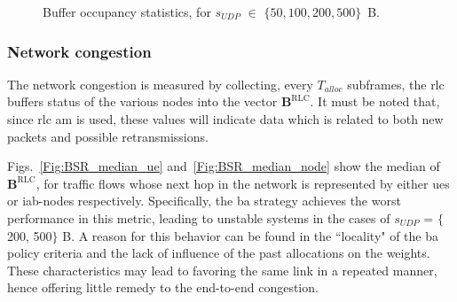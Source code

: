 \begin{figure}[tbp]
\centering
  \hfill
  \hfill
   \caption{Buffer occupancy statistics, for $s_{UDP}$ $\in$ $\{50, 100, 200, 500 \}$~B.}
  \label{Fig:BSR_median}
    \vspace{-.6cm} 
\end{figure}

\subsubsection{Network congestion}

The network congestion is measured by collecting, every $T_{alloc}$ subframes, the \gls{rlc} buffers status of the various nodes into the vector $\mathbf{B}^{\mathrm{RLC}}$. It must be noted that, since \gls{rlc} \gls{am} is used, these values will indicate data which is related to both new packets and possible retransmissions.

Figs.~\ref{Fig:BSR_median_ue} and~\ref{Fig:BSR_median_node} show the median of $\mathbf{B}^{\mathrm{RLC}}$, for traffic flows whose next hop in the network is represented by either \glspl{ue} or \gls{iab}-nodes respectively. Specifically, the \gls{ba} strategy achieves the worst performance in this metric, leading to unstable systems in the cases of $s_{UDP}$ = $\{$200, 500$\}$ B. 
A reason for this behavior can be found in the ``locality" of the \gls{ba} policy criteria and the lack of influence of the past allocations on the weights. These characteristics may lead to favoring the same link in a repeated manner, hence offering little remedy to the end-to-end congestion.

